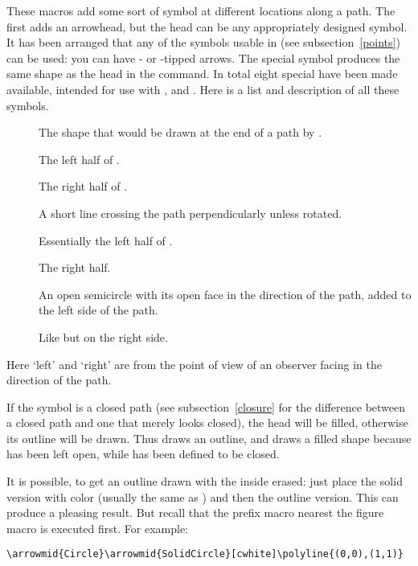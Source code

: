 \documentclass[letterpaper]{article}
\begin{document}
These macros add some sort of symbol at different locations along a
path. The first adds an arrowhead, but the head can be any appropriately
designed symbol. It has been arranged that any of the symbols usable in
 (see subsection~\ref{points}) can be used: you can have
- or -tipped arrows. The special symbol
 produces the same shape as the head in the 
command. In total eight special  have been made available,
intended for use with ,  and .
Here is a list and description of all these symbols.
\begin{description}
  \item[] The shape that
    would be drawn at the end of a path by .
  \item[] The left
    half of .
  \item[] The
    right half of .
  \item[] A short
    line crossing the path perpendicularly unless rotated.
  \item[] Essentially the left
    half of .
  \item[] The right half.
  \item[] An open
    semicircle with its open face in the direction of the path, added to
   the left side of the path.
  \item[] Like
     but on the right side.
\end{description}
Here `left' and `right' are from the point of view of an observer facing
in the direction of the path.

If the symbol is a closed path (see subsection~\ref{closure} for the
difference between a closed path and one that merely looks closed), the
head will be filled, otherwise its outline will be drawn. Thus
 draws an outline, and
 draws a filled shape because
 has been left open, while  has been
defined to be closed.

It is possible, to get an outline drawn with the inside erased: just
place the solid version with color  (usually the same as
) and then the outline version. This can produce a pleasing
result. But recall that the prefix macro nearest the figure macro is
executed first. For example:
%
\begin{verbatim}
\arrowmid{Circle}\arrowmid{SolidCircle}[cwhite]\polyline{(0,0),(1,1)}
\end{verbatim}
\end{document}
